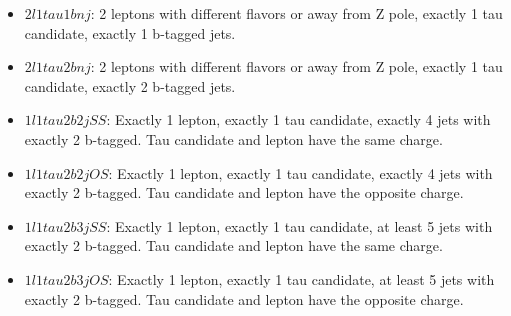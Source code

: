 \begin{itemize}
\item{$2l1tau1bnj$: 2 leptons with different flavors or away from Z pole, exactly 1 tau candidate,  exactly 1 b-tagged jets.}
\item{$2l1tau2bnj$: 2 leptons with different flavors or away from Z pole, exactly 1 tau candidate,  exactly 2 b-tagged jets.}
\item{$1l1tau2b2j SS$: Exactly 1 lepton, exactly 1 tau candidate, exactly 4 jets with exactly 2 b-tagged. Tau candidate and lepton have the same charge.}
\item{$1l1tau2b2j OS$: Exactly 1 lepton, exactly 1 tau candidate, exactly 4 jets with exactly 2 b-tagged. Tau candidate and lepton have the opposite charge.}
\item{$1l1tau2b3j SS$: Exactly 1 lepton, exactly 1 tau candidate, at least 5 jets with exactly 2 b-tagged. Tau candidate and lepton have the same charge.}
\item{$1l1tau2b3j OS$: Exactly 1 lepton, exactly 1 tau candidate, at least 5 jets with exactly 2 b-tagged. Tau candidate and lepton have the opposite charge.}
\end{itemize}

